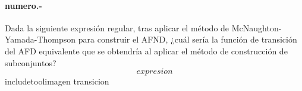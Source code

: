 

\paragraph{{numero}.-}\label{p{numero}}
Dada la siguiente expresión regular, tras aplicar el método de McNaughton-Yamada-Thompson para construir el AFND, ¿cuál sería la función de transición del AFD equivalente que se obtendría al aplicar el método de construcción de subconjuntos?
\[
    {expresion}
\]
{includetool}{{imagen}}
{transicion}
